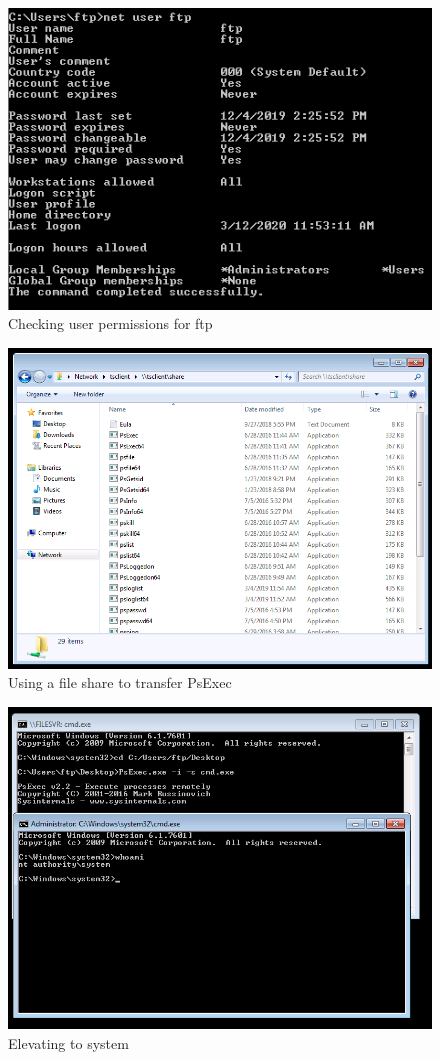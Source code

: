 \documentclass{report}
\begin{document}
\begin{figure}[!htb]
	\centering
	\includegraphics[scale=0.6]{img/privesc1.png}
	\caption{Checking user permissions for ftp}
\end{figure}
\begin{figure}[!htb]
	\centering
	\includegraphics[scale=0.5]{img/privesc2.png}
	\caption{Using a file share to transfer PsExec}
\end{figure}
\begin{figure}[!htb]
	\centering
	\includegraphics[scale=0.5]{img/privesc3.png}
	\caption{Elevating to system}
\end{figure}
\pagebreak
\end{document}
